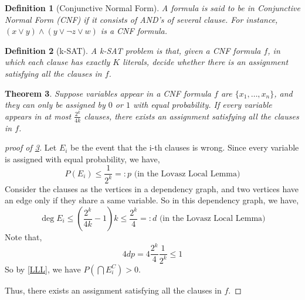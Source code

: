 \documentclass{article}
\newtheorem{theorem}{Theorem}
\newtheorem{definition}[theorem]{Definition}
\begin{document}
\begin{tcolorbox}
    \begin{definition}[Conjunctive Normal Form]\label{CNF}
        A formula is said to be in Conjunctive Normal Form (CNF) if it consists of AND's of several clause. For instance, $(x\vee y)\wedge(y\vee \neg z \vee w)$ is a CNF formula.
    \end{definition}

    \begin{definition}[k-SAT]\label{ksat}
        A k-SAT problem is that, given a CNF formula $f$, in which each clause has exactly $K$ literals, decide whether there is an assignment satisfying all the clauses in $f$.
    \end{definition}

    \begin{theorem}\label{satthm}
        Suppose variables appear in a CNF formula $f$ are $\{x_1, \ldots, x_n\}$, and they can only be assigned by $0$ or $1$ with equal probability. If every variable appears in at most $\frac{2^k}{4k}$ clauses, there exists an assignment satisfying all the clauses in $f$.
    \end{theorem}
\end{tcolorbox}

\begin{proof}[proof of \cref{satthm}]
    Let $E_i$ be the event that the i-th clauses is wrong. Since every variable is assigned with equal probability, we have,
    \[
        P(E_i)\leq\frac{1}{2^k} =: p \mbox{ (in the Lovasz Local Lemma)}
    \]
    Consider the clauses as the vertices in a dependency graph, and two vertices have an edge only if they share a same variable. So in this dependency graph, we have, 
    \[
        \deg E_i \leq (\frac{2^k}{4k} - 1)k \leq \frac{2^k}{4} =: d \mbox{ (in the Lovasz Local Lemma)}
    \]
    Note that, \[4dp = 4 \frac{2^k}{4} \frac{1}{2^k} \leq 1
        \]
    So by \cref{LLL}, we have $P(\bigcap E_i^C) > 0$.
    
    Thus, there exists an assignment satisfying all the clauses in $f$.
\end{proof}




\end{document}
